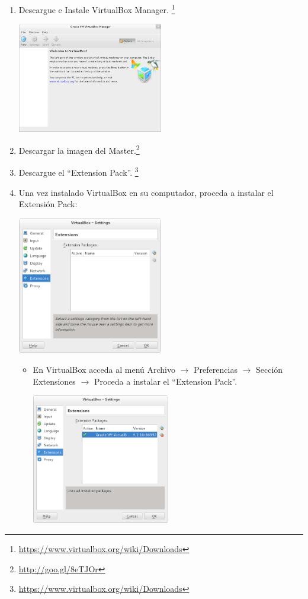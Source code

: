 \begin{enumerate}

\item Descargue e Instale VirtualBox Manager. \footnote{\url{https://www.virtualbox.org/wiki/Downloads}}

\includegraphics[width=0.5\textwidth]{aux/vb_instalado}

\item Descargar la imagen del Master.\footnote{\url{http://goo.gl/8eTJOr}}

\item Descargue el ``Extension Pack''. \footnote{\url{https://www.virtualbox.org/wiki/Downloads}}

\item Una vez instalado VirtualBox en su computador, proceda a instalar el Extensión Pack: 

	\includegraphics[width=0.5\textwidth]{aux/sinextensionpack}
	
\begin{itemize}


	\item En VirtualBox acceda al menú Archivo $\rightarrow$ Preferencias $\rightarrow$ Sección Extensiones $\rightarrow$ Proceda a instalar el ``Extension Pack''. 
	
	\includegraphics[width=0.5\textwidth]{aux/conextensionpack}


\end{itemize}
\end{enumerate}
